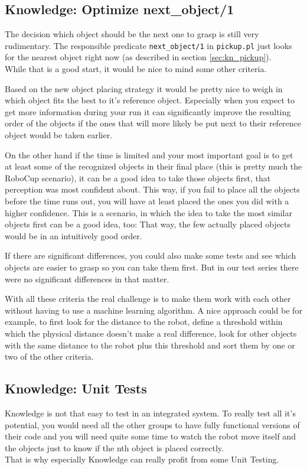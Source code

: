 \documentclass[main.tex]{subfiles}
\begin{document}
	  	\subsection{Knowledge: Optimize next\_object/1}
	  	The decision which object should be the next one to grasp is still very rudimentary. The responsible predicate \texttt{next\_object/1} in \texttt{pickup.pl} just looks for the nearest object right now (as described in section \ref{sec:kn_pickup}).\\
	  	While that is a good start, it would be nice to mind some other criteria.
	  	
	  	Based on the new object placing strategy it would be pretty nice to weigh in which object fits the best to it's reference object. Especially when you expect to get more information during your run it can significantly improve the resulting order of the objects if the ones that will more likely be put next to their reference object would be taken earlier.
	  	
		On the other hand if the time is limited and your most important goal is to get at least some of the recognized objects in their final place (this is pretty much the RoboCup scenario), it can be a good idea to take those objects first, that perception was most confident about. This way, if you fail to place all the objects before the time runs out, you will have at least placed the ones you did with a higher confidence. This is a scenario, in which the idea to take the most similar objects first can be a good idea, too: That way, the few actually placed objects would be in an intuitively good order.
		
		If there are significant differences, you could also make some tests and see which objects are easier to grasp so you can take them first. But in our test series there were no significant differences in that matter. 
		
		With all these criteria the real challenge is to make them work with each other without having to use a machine learning algorithm. A nice approach could be for example, to first look for the distance to the robot, define a threshold within which the physical distance doesn't make a real difference, look for other objects with the same distance to the robot plus this threshold and sort them by one or two of the other criteria. 
		
		\subsection{Knowledge: Unit Tests}
		Knowledge is not that easy to test in an integrated system. To really test all it's potential, you would need all the other groups to have fully functional versions of their code and you will need quite some time to watch the robot move itself and the objects just to know if the nth object is placed correctly.\\
		That is why especially Knowledge can really profit from some Unit Testing.
		
\end{document}

